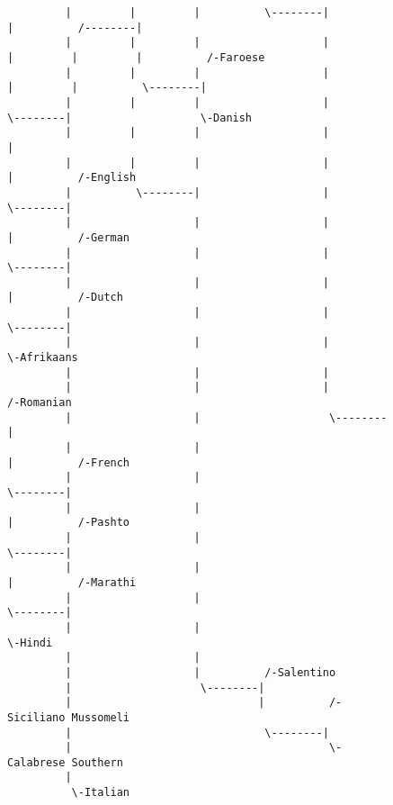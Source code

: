 \begin{figure}[!htb]
\begin{center}
{\begin{verbatim}
         |         |         |          \--------|                             |          /--------|
         |         |         |                   |                             |         |         |          /-Faroese
         |         |         |                   |                             |         |          \--------|
         |         |         |                   |                              \--------|                    \-Danish
         |         |         |                   |                                       |
         |         |         |                   |                                       |          /-English
         |          \--------|                   |                                        \--------|
         |                   |                   |                                                 |          /-German
         |                   |                   |                                                  \--------|
         |                   |                   |                                                           |          /-Dutch
         |                   |                   |                                                            \--------|
         |                   |                   |                                                                      \-Afrikaans
         |                   |                   |
         |                   |                   |          /-Romanian
         |                   |                    \--------|
         |                   |                             |          /-French
         |                   |                              \--------|
         |                   |                                       |          /-Pashto
         |                   |                                        \--------|
         |                   |                                                 |          /-Marathi
         |                   |                                                  \--------|
         |                   |                                                            \-Hindi
         |                   |
         |                   |          /-Salentino
         |                    \--------|
         |                             |          /-Siciliano Mussomeli
         |                              \--------|
         |                                        \-Calabrese Southern
         |
          \-Italian

\end{verbatim}
}
\label{...}
\end{center}
\end{figure}
